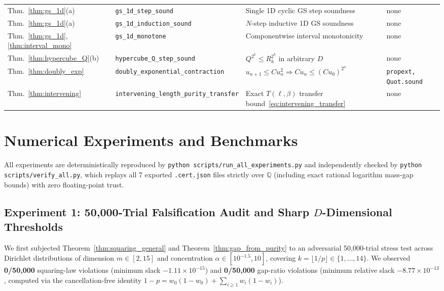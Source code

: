 \documentclass[11pt,a4paper]{article}
\theoremstyle{definition}
\newcommand{\Q}{\mathbb{Q}}
\begin{document}
\begin{table}[t]
{\begin{tabular}{@{}llll@{}}
Thm.~\ref{thm:gs_1d}(a) & \texttt{gs\_1d\_step\_sound} & Single 1D cyclic GS step soundness & none \\
Thm.~\ref{thm:gs_1d}(a) & \texttt{gs\_1d\_induction\_sound} & $N$-step inductive 1D GS soundness & none \\
Thm.~\ref{thm:gs_1d}, \ref{thm:interval_mono} & \texttt{gs\_1d\_monotone} & Componentwise interval monotonicity & none \\
Thm.~\ref{thm:hypercube_Q}(b) & \texttt{hypercube\_Q\_step\_sound} & $Q^{2^k} \le R_k^{2^k}$ in arbitrary $D$ & none \\
Thm.~\ref{thm:doubly_exp} & \texttt{doubly\_exponential\_contraction} & $u_{n+1}\le C u_n^2 \Rightarrow C u_n \le (C u_0)^{2^n}$ & \texttt{propext, Quot.sound} \\
Thm.~\ref{thm:intervening} & \texttt{intervening\_length\_purity\_transfer} & Exact $T(\ell,\beta)$ transfer bound~\eqref{eq:intervening_transfer} & none \\
\bottomrule
\end{tabular}%
}
\end{table}

\section{Numerical Experiments and Benchmarks}
\label{sec:experiments}

All experiments are deterministically reproduced by \texttt{python scripts/run\_all\_experiments.py} and independently checked by \texttt{python scripts/verify\_all.py}, which replays all 7 exported \texttt{.cert.json} files strictly over $\Q$ (including exact rational logarithm mass-gap bounds) with zero floating-point trust.

\subsection{Experiment 1: 50,000-Trial Falsification Audit and Sharp \texorpdfstring{$D$}{D}-Dimensional Thresholds}

We first subjected Theorem~\ref{thm:squaring_general} and Theorem~\ref{thm:gap_from_purity} to an adversarial 50,000-trial stress test across Dirichlet distributions of dimension $m \in [2,15]$ and concentration $\alpha \in [10^{-1.5}, 10]$, covering $k = \lfloor 1/p \rfloor \in \{1,\dots,14\}$. We observed \textbf{0/50,000} squaring-law violations (minimum slack $-1.11 \times 10^{-15}$) and \textbf{0/50,000} gap-ratio violations (minimum relative slack $-8.77 \times 10^{-13}$, computed via the cancellation-free identity $1-p = w_0(1-w_0) + \sum_{i\ge 1} w_i(1-w_i)$).
\end{document}
